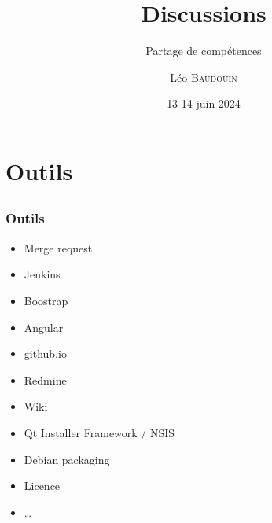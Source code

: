 \documentclass{beamer}
\title{Discussions}
\subtitle{Partage de compétences}
\author{L\'eo \textsc{Baudouin}}
\institute{
  {\url{baudouin.leo @ gmail.com}}
}
\date{13-14 juin 2024}
\begin{document}
\begin{frame}
  \titlepage
\end{frame}




\section{Outils}
\subsection{}

\begin{frame}
  \frametitle{Outils}
  \begin{block}{}
  \begin{itemize}[<+->]
  \item Merge request
  \item Jenkins
  \item Boostrap
  \item Angular
  \item github.io
  \item Redmine
  \item Wiki
  \item Qt Installer Framework / NSIS
  \item Debian packaging
  \item Licence
  \item \dots
  \end{itemize}
  \end{block}  
\end{frame}

\end{document}
